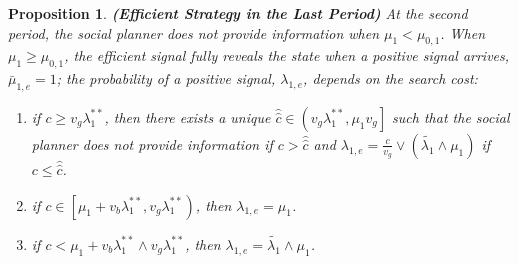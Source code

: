 \documentclass[11pt]{extarticle}
\newtheorem{proposition}{Proposition}
\newcommand{\m}{\wedge}
\newcommand{\M}{\vee}
\begin{document}
\begin{proposition}\label{estrategy1p}\textbf{(Efficient Strategy in the Last Period)}
	At the second period, the social planner does not provide information when $\mu_1 < \mu_{0,1}$. When $\mu_1 \geq \mu_{0,1}$, the efficient signal fully reveals the state when a positive signal arrives, $\bar{\mu}_{1,e} = 1$; the probability of a positive signal, $\lambda_{1,e}$, depends on the search cost:
	\begin{enumerate}
		\item if $c \geq v_g \lambda_1^{**}$, then there exists a unique $\widehat{\widehat{c}} \in \left(v_g\lambda_1^{**}, \mu_1v_g\right]$ such that the social planner does not provide information if $c > \widehat{\widehat{c}}$ and $\lambda_{1,e} = 
		\frac{c}{v_g} \M (\tilde{\lambda_1}\m \mu_1)$ if $c \leq \widehat{\widehat{c}}$.
		
		\item if $c \in \left[\mu_1 +v_b\lambda_1^{**},v_g\lambda_1^{**} \right)$, then $\lambda_{1,e} = \mu_1$.
		
		\item if $c < \mu_1 +v_b\lambda_1^{**} \m v_g \lambda_1^{**}$, then $\lambda_{1,e} = \tilde{\lambda_1}\m \mu_1$.
	\end{enumerate}
\end{proposition}
\end{document}
